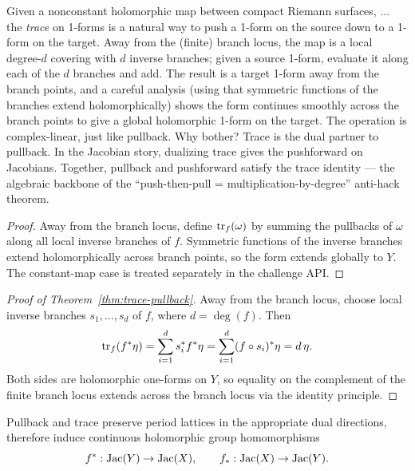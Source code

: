 \begin{layman}
Given a nonconstant holomorphic map between compact Riemann surfaces,
...
the \emph{trace} on 1-forms is a natural way to push a 1-form on the
source down to a 1-form on the target. Away from the (finite) branch
locus, the map is a local degree-\(d\) covering with \(d\) inverse
branches; given a source 1-form, evaluate it along each of the \(d\)
branches and add. The result is a target 1-form away from the branch
points, and a careful analysis (using that symmetric functions of the
branches extend holomorphically) shows the form continues smoothly
across the branch points to give a global holomorphic 1-form on the
target. The operation is complex-linear, just like pullback. Why
bother? Trace is the dual partner to pullback. In the Jacobian story,
dualizing trace gives the pushforward on Jacobians. Together,
pullback and pushforward satisfy the trace identity --- the algebraic
backbone of the ``push-then-pull = multiplication-by-degree''
anti-hack theorem.
\end{layman}

\begin{proof}\leanok
Away from the branch locus, define \(\operatorname{tr}_f(\omega)\) by summing the pullbacks
of \(\omega\) along all local inverse branches of \(f\). Symmetric functions
of the inverse branches extend holomorphically across branch points, so the
form extends globally to \(Y\). The constant-map case is treated separately in
the challenge API.
\end{proof}

\begin{proof}[Proof of Theorem~\ref{thm:trace-pullback}]\leanok
Away from the branch locus, choose local inverse branches
\(s_1,\dots,s_d\) of \(f\), where \(d=\deg(f)\). Then
\[
  \operatorname{tr}_f(f^{*}\eta)
  =
  \sum_{i=1}^{d}s_i^{*}f^{*}\eta
  =
  \sum_{i=1}^{d}(f\circ s_i)^{*}\eta
  =
  d\,\eta.
\]
Both sides are holomorphic one-forms on \(Y\), so equality on the complement
of the finite branch locus extends across the branch locus via the identity principle.
\end{proof}

\begin{lemma}
\label{lem:push-pull-descend}
Pullback and trace preserve period lattices in the appropriate dual directions,
therefore induce continuous holomorphic group homomorphisms
\[
  f^{*}:\operatorname{Jac}(Y)\to\operatorname{Jac}(X), \qquad f_*:\operatorname{Jac}(X)\to\operatorname{Jac}(Y).
\]
\leanok
\end{lemma}

